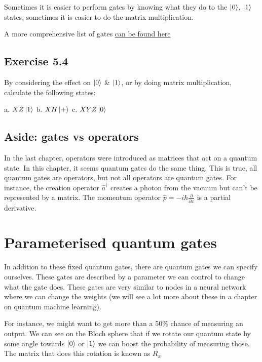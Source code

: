 \documentclass{book}
\begin{document}
Sometimes it is easier to perform gates by knowing what they do to the $\ket{0}$, $\ket{1}$ states, sometimes it is easier to do the matrix multiplication. 

A more comprehensive list of gates \href{https://raw.githubusercontent.com/qiskit-community/qiskit-textbook/main/content/ch-states/supplements/single-gates-cheatsheet.pdf}{can be found here}


\hline
\subsection{Exercise 5.4}

By considering the effect on $\ket{0}$ \& $ \ket{1}$, or by doing matrix multiplication, calculate the following states:

a. $ XZ\ket{1}$  
b. $ XH\ket{+} $  
c. $ XYZ\ket{0} $
\hline

\subsection{Aside: gates vs operators}

In the last chapter, operators were introduced as matrices that act on a quantum state. In this chapter, it seems quantum gates do the same thing. This is true, all quantum gates are operators, but not all operators are quantum gates. 
For instance, the creation operator $\hat{a}^\dagger$ creates a photon from the vacuum but can't be represented by a matrix. The momentum operator $\hat{p} = -i\hbar\frac{\partial}{\partial x}$ is a partial derivative. 


\section{Parameterised quantum gates }

In addition to these fixed quantum gates, there are quantum gates we can specify ourselves. These gates are described by a parameter we can control to change what the gate does. These gates are very similar to nodes in a neural network where we can change the weights (we will see a lot more about these in a chapter on quantum machine learning).

For instance, we might want to get more than a 50\% chance of measuring an output. We can see on the Bloch sphere that if we rotate our quantum state by some angle towards $\ket{0}$ or $\ket{1}$ we can boost the probability of measuring those. The matrix that does this rotation is known as $R_x$
\end{document}
